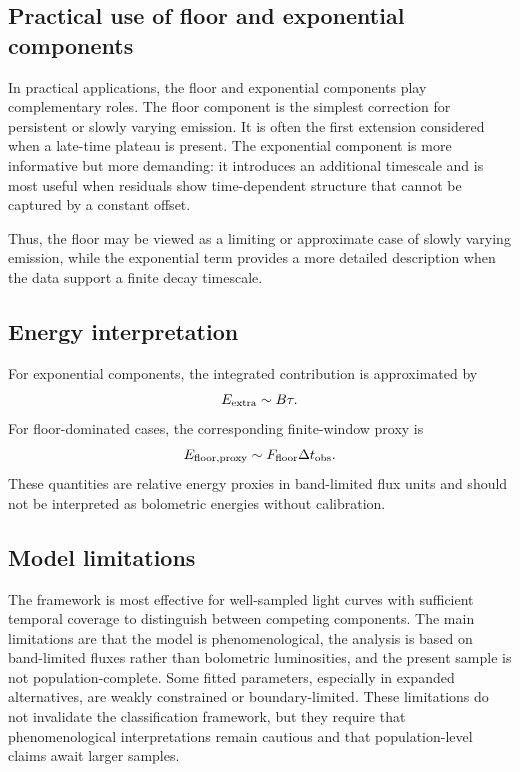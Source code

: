 \documentclass[11pt]{article}
\begin{document}
\subsection{Practical use of floor and exponential components}
In practical applications, the floor and exponential components play complementary roles. The floor component is the simplest correction for persistent or slowly varying emission. It is often the first extension considered when a late-time plateau is present. The exponential component is more informative but more demanding: it introduces an additional timescale and is most useful when residuals show time-dependent structure that cannot be captured by a constant offset.

Thus, the floor may be viewed as a limiting or approximate case of slowly varying emission, while the exponential term provides a more detailed description when the data support a finite decay timescale.

\subsection{Energy interpretation}
For exponential components, the integrated contribution is approximated by
\begin{equation}
E_{\rm extra}\sim B\tau.
\end{equation}
For floor-dominated cases, the corresponding finite-window proxy is
\begin{equation}
E_{\rm floor,proxy}\sim F_{\rm floor}\Delta t_{\rm obs}.
\end{equation}
These quantities are relative energy proxies in band-limited flux units and should not be interpreted as bolometric energies without calibration.

\subsection{Model limitations}
The framework is most effective for well-sampled light curves with sufficient temporal coverage to distinguish between competing components. The main limitations are that the model is phenomenological, the analysis is based on band-limited fluxes rather than bolometric luminosities, and the present sample is not population-complete. Some fitted parameters, especially in expanded alternatives, are weakly constrained or boundary-limited. These limitations do not invalidate the classification framework, but they require that phenomenological interpretations remain cautious and that population-level claims await larger samples.
\end{document}

